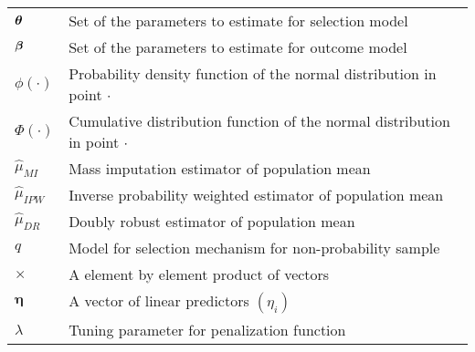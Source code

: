\documentclass[
  letterpaper,
  DIV=11,
  numbers=noendperiod]{scrreprt}
\begin{document}
\begin{longtable}[]{@{}
  >{\raggedright\arraybackslash}p{}
  >{\raggedright\arraybackslash}p{}@{}}
\(\boldsymbol{\theta}\) & Set of the parameters to estimate for selection model \\
\(\boldsymbol{\beta}\) & Set of the parameters to estimate for outcome model \\
\(\phi(\cdot)\) & Probability density function of the normal
distribution in point \(\cdot\) \\
\(\Phi(\cdot)\) & Cumulative distribution function of the normal
distribution in point \(\cdot\) \\
\(\hat{\mu}_{MI}\) & Mass imputation estimator of population mean \\
\(\hat{\mu}_{IPW}\) & Inverse probability weighted estimator of
population mean \\
\(\hat{\mu}_{DR}\) & Doubly robust estimator of population mean \\
\(q\) & Model for selection mechanism for non-probability sample \\
\(\times\) & A element by element product of vectors \\
\(\boldsymbol{\eta}\) & A vector of linear predictors \((\eta_{i})\) \\
\(\lambda\) & Tuning parameter for penalization function \\
\end{longtable}
\end{document}
